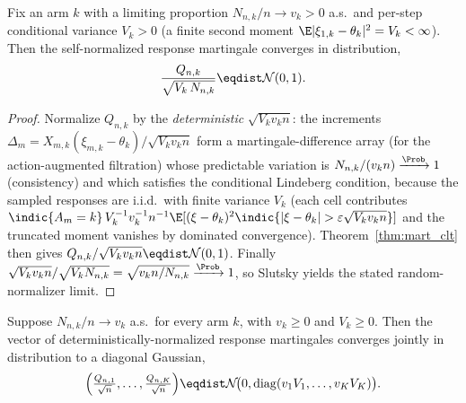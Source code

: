 \begin{lemma}\label{lem:mart_clt_selfnorm_arm}
\leanok
{}
Fix an arm $k$ with a limiting proportion $N_{n,k}/n\to v_k>0$ a.s.\ and per-step conditional
variance $V_k>0$ (a finite second moment $\E|\xi_{1,k}-\theta_k|^2 = V_k<\infty$). Then the
self-normalized response martingale converges in distribution,
\[
  \frac{Q_{n,k}}{\sqrt{V_k\,N_{n,k}}} \eqdist \mathcal N(0,1).
\]
\end{lemma}

\begin{proof}\leanok
{}
Normalize $Q_{n,k}$ by the \emph{deterministic} $\sqrt{V_k v_k n}$: the increments
$\Delta_{m}=X_{m,k}(\xi_{m,k}-\theta_k)/\sqrt{V_k v_k n}$ form a martingale-difference array (for the
action-augmented filtration) whose predictable variation is $N_{n,k}/(v_k n)\xrightarrow{\Prob}1$
(consistency) and which satisfies the conditional Lindeberg condition, because the sampled responses
are i.i.d.\ with finite variance $V_k$ (each cell contributes
$\indic\{A_m=k\}\,V_k^{-1}v_k^{-1}n^{-1}\E[(\xi-\theta_k)^2\indic\{|\xi-\theta_k|>\varepsilon\sqrt{V_k v_k n}\}]$
and the truncated moment vanishes by dominated convergence). Theorem~\ref{thm:mart_clt} then gives
$Q_{n,k}/\sqrt{V_k v_k n}\eqdist\mathcal N(0,1)$. Finally
$\sqrt{V_k v_k n}/\sqrt{V_k N_{n,k}}=\sqrt{v_k n/N_{n,k}}\xrightarrow{\Prob}1$, so Slutsky yields the
stated random-normalizer limit.
\end{proof}

\begin{lemma}\label{lem:mart_clt_joint}
\leanok
{}
Suppose $N_{n,k}/n\to v_k$ a.s.\ for every arm $k$, with $v_k\ge0$ and $V_k\ge0$. Then the vector of
deterministically-normalized response martingales converges jointly in distribution to a diagonal
Gaussian,
\[
  \Big(\tfrac{Q_{n,1}}{\sqrt n},\dots,\tfrac{Q_{n,K}}{\sqrt n}\Big)
    \eqdist \mathcal N\!\big(0, \mathrm{diag}(v_1V_1,\dots,v_KV_K)\big).
\]
\end{lemma}


